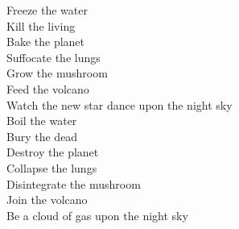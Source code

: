 Freeze the water \\
Kill the living \\
Bake the planet \\
Suffocate the lungs \\
Grow the mushroom \\
Feed the volcano \\
Watch the new star dance upon the night sky \\

Boil the water \\
Bury the dead \\
Destroy the planet \\
Collapse the lungs \\
Disintegrate the mushroom \\
Join the volcano \\
Be a cloud of gas upon the night sky \\
